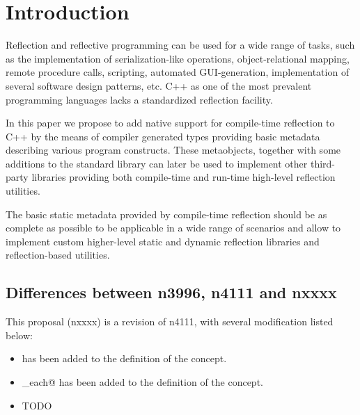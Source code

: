 \section{Introduction}

Reflection and reflective programming can be used
for a wide range of tasks, such as the implementation
of serialization-like operations, object-relational mapping,
remote procedure calls, scripting, automated GUI-generation,
implementation of several software design patterns, etc.
C++ as one of the most prevalent programming languages 
lacks a standardized reflection facility.

In this paper we propose to add native support for
compile-time reflection to C++ by the means of compiler generated
types providing basic metadata describing various program constructs.
These metaobjects, together with some additions to the standard
library can later be used to implement other third-party libraries
providing both compile-time and run-time high-level
reflection utilities.

The basic static metadata provided by compile-time reflection
should be as complete as possible to be applicable in a wide
range of scenarios and allow to implement custom higher-level
static and dynamic reflection libraries and reflection-based
utilities.

\subsection{Differences between n3996, n4111 and nxxxx}

This proposal (nxxxx) is a revision of n4111, with several modification
listed below:

\begin{itemize}
\item \verb@position@ has been added to the definition of the  concept.
\item \verb@for_each@ has been added to the definition of the  concept.
\item TODO
\end{itemize}

